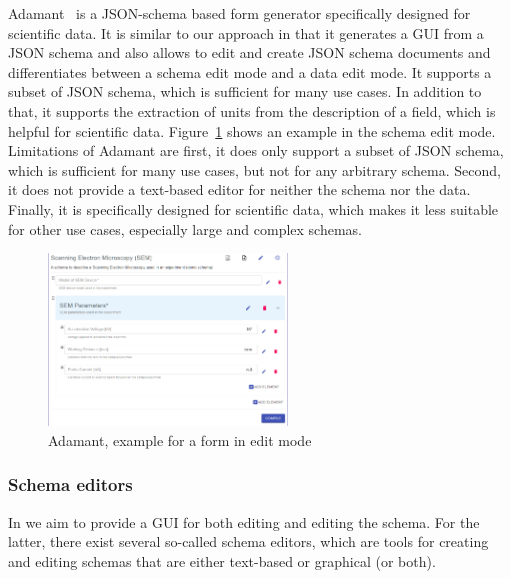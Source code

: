Adamant~\cite{siffa2022adamant} is a JSON-schema based form generator specifically designed for scientific data.
It is similar to our approach in that it generates a GUI from a JSON schema and also allows to edit and create JSON schema documents
and differentiates between a schema edit mode and a data edit mode.
It supports a subset of JSON schema, which is sufficient for many use cases.
In addition to that, it supports the extraction of units from the description of a field, which is helpful for scientific data.
Figure~\ref{fig:adamant} shows an example in the schema edit mode.
Limitations of Adamant are first, it does only support a subset of JSON schema, which is sufficient for many use cases, but not for any arbitrary schema.
Second, it does not provide a text-based editor for neither the schema nor the data.
Finally, it is specifically designed for scientific data, which makes it less suitable for other use cases, especially large and complex schemas.

\begin{figure}[htb]
    \centering
    \includegraphics[width=2.5in]{figures/adamant}
    \caption{Adamant, example for a form in edit mode}
    \label{fig:adamant}
\end{figure}


\subsubsection{Schema editors}\label{subsubsec:schema-editors}
In \toolname{} we aim to provide a GUI for both editing \cfgfiles{} and editing the schema.
For the latter, there exist several so-called schema editors, which are tools for creating and editing schemas that are
either text-based or graphical (or both).


